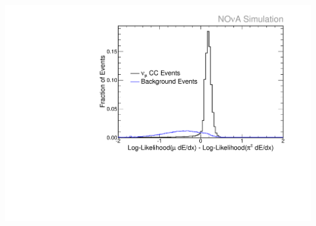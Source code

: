 \documentclass[10pt,professionalfonts,xcolor=table]{beamer}
\begin{document}
\begin{frame}
\begin{columns}[c]
\includegraphics[height=\textwidth, angle=-90]{figures/plots/reco/remid_dedxll.pdf}

\end{columns}


\end{frame}
\end{document}
